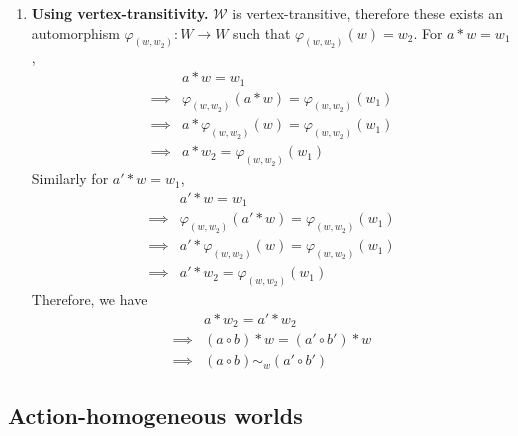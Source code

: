 \begin{proofE}
\begin{enumerate}[(1)]
    \item \textbf{Using vertex-transitivity.}
    $\mathscr{W}$ is vertex-transitive, therefore these exists an automorphism $\varphi_{(w, w_{2})}: W \to W$ such that $\varphi_{(w, w_{2})}(w) = w_{2}$.
    For $a \ast w = w_{1}$,
    \begin{align}
        & a \ast w = w_{1} \\
        \implies & \varphi_{(w, w_{2})}(a \ast w) = \varphi_{(w, w_{2})}(w_{1}) \\
        \implies & a \ast \varphi_{(w, w_{2})}(w) = \varphi_{(w, w_{2})}(w_{1}) \\
        \implies & a \ast w_{2} = \varphi_{(w, w_{2})}(w_{1})
    \end{align}
    Similarly for $a' \ast w = w_{1}$,
    \begin{align}
        & a' \ast w = w_{1} \\
        \implies & \varphi_{(w, w_{2})}(a' \ast w) = \varphi_{(w, w_{2})}(w_{1}) \\
        \implies & a' \ast \varphi_{(w, w_{2})}(w) = \varphi_{(w, w_{2})}(w_{1}) \\
        \implies & a' \ast w_{2} = \varphi_{(w, w_{2})}(w_{1})
    \end{align}
    Therefore, we have
    \begin{align}
        & a \ast w_{2} = a' \ast w_{2} \\
        \implies & (a \circ b) \ast w = (a' \circ b') \ast w \\
        \implies & (a \circ b) \sim_{w} (a' \circ b')
    \end{align}
\end{enumerate}
\end{proofE}

\subsection{Action-homogeneous worlds}


